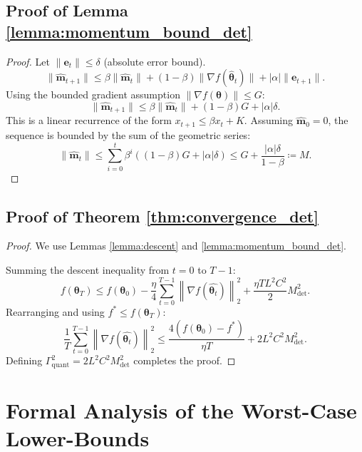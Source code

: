 \documentclass[11pt, a4paper, onecolumn, copyright, goog]{google}
\newcommand{\vect}[1]{\mathbf{#1}}
\newcommand{\vtheta}{\boldsymbol{\theta}}
\newcommand{\vm}{\vect{m}}
\newcommand{\ve}{\vect{e}}
\newcommand{\norm}[1]{\left\lVert#1\right\rVert_2}
\theoremstyle{plain}
\theoremstyle{definition}
\theoremstyle{remark}
\begin{document}
\subsection{Proof of Lemma \ref{lemma:momentum_bound_det}}
\label{proof:lemma_momentum_bound_det}
\begin{proof}
Let $\|\ve_t\| \le \delta$ (absolute error bound).
\begin{equation}
    \|\hat{\vm}_{t+1}\| \le \beta \|\hat{\vm}_t\| + (1-\beta)\|\nabla f(\hat{\vtheta}_t)\| + |\alpha| \|\ve_{t+1}\|.
\end{equation}
Using the bounded gradient assumption $\|\nabla f(\vtheta)\| \le G$:
\begin{equation}
    \|\hat{\vm}_{t+1}\| \le \beta \|\hat{\vm}_t\| + (1-\beta) G + |\alpha| \delta.
\end{equation}
This is a linear recurrence of the form $x_{t+1} \le \beta x_t + K$. Assuming $\hat{\vm}_0 = 0$, the sequence is bounded by the sum of the geometric series:
\begin{equation}
    \|\hat{\vm}_t\| \le \sum_{i=0}^{t} \beta^i ((1-\beta)G + |\alpha|\delta) \le G + \frac{|\alpha| \delta}{1-\beta} \coloneqq M.
\end{equation}
\end{proof}

\subsection{Proof of Theorem \ref{thm:convergence_det}}
\label{apx:convergence_proof_det}

\begin{proof}
We use Lemmas \ref{lemma:descent} and \ref{lemma:momentum_bound_det}.

Summing the descent inequality from $t=0$ to $T-1$:
\begin{equation}
    f(\vtheta_T) \le f(\vtheta_0) - \frac{\eta}{4} \sum_{t=0}^{T-1} \norm{\nabla f(\hat{\vtheta_t})}^2 + \frac{\eta T L^2 C^2}{2} M_{\text{det}}^2.
\end{equation}
Rearranging and using $f^* \le f(\vtheta_T)$:
\begin{equation}
    \frac{1}{T} \sum_{t=0}^{T-1} \norm{\nabla f(\hat{\vtheta_t})}^2 \le \frac{4(f(\vtheta_0) - f^*)}{\eta T} + 2L^2 C^2 M_{\text{det}}^2.
\end{equation}
Defining $\Gamma_{\text{quant}}^2 = 2L^2 C^2 M_{\text{det}}^2$ completes the proof.
\end{proof}

\section{Formal Analysis of the Worst-Case Lower-Bounds}
\label{apx:fundamental}
\end{document}
